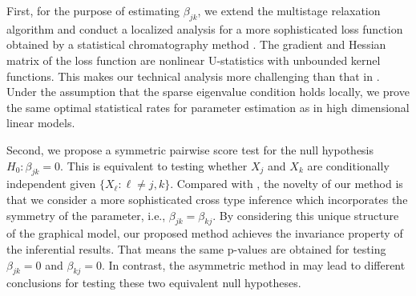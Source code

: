 \documentclass[twoside,11pt]{article}
\begin{document}
First, for the purpose of estimating  $\beta_{jk}$, we extend the multistage relaxation algorithm \citep{zhang2010analysis} and conduct a localized analysis for a more sophisticated loss function obtained by a statistical chromatography method \citep{liang2000regression,diao2012maximum,chan2012nuisance, ning2014sparc}. The gradient and    Hessian matrix of the loss function are nonlinear U-statistics with unbounded kernel functions. This makes our technical analysis more challenging than that in  \cite{zhang2010analysis}. Under the assumption that the sparse eigenvalue condition holds locally, we prove the same optimal statistical rates for parameter estimation as in high dimensional linear models.

Second, we propose a symmetric pairwise score test for the null hypothesis $H_0 \colon \beta_{jk} = 0$. This is equivalent to testing whether $X_j$ and $X_k$ are conditionally independent given $\{ X_{\ell}\colon \ell\neq j,k\}$. Compared with \cite{ning2014sparc}, the novelty of our method is that we consider a more sophisticated cross type inference which incorporates the symmetry of the parameter, i.e., $\beta_{jk}=\beta_{kj}$. By considering this unique structure of the graphical model, our proposed method achieves the invariance property of the inferential results. That means the same p-values are obtained for testing  $\beta_{jk} = 0$ and $\beta_{kj} = 0$. In contrast, the asymmetric method in \cite{ning2014sparc} may lead to different conclusions for testing these two equivalent null hypotheses. 





\end{document}
